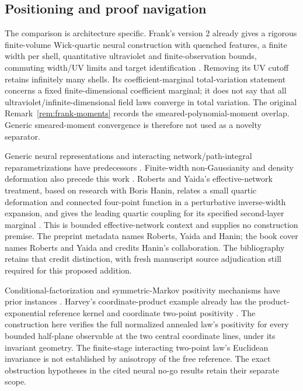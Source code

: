 \documentclass[11pt]{article}
\theoremstyle{plain}
\theoremstyle{definition}
\theoremstyle{remark}
\begin{document}
\subsection{Positioning and proof navigation}
\label{qrs:positioning}

The comparison is architecture specific. Frank's version 2 already gives
a rigorous finite-volume Wick-quartic neural construction with quenched
features, a finite width per shell, quantitative ultraviolet and
finite-observation bounds, commuting width/UV limits and target
identification \cite{Frank2026v2}. Removing its UV cutoff retains
infinitely many shells. Its coefficient-marginal total-variation statement
concerns a fixed finite-dimensional coefficient marginal; it does not say
that all ultraviolet/infinite-dimensional field laws converge in total
variation. The original Remark~\ref{rem:frank-moments} records the
smeared-polynomial-moment overlap. Generic smeared-moment convergence is
therefore not used as a novelty separator.

Generic neural representations and interacting network/path-integral
reparametrizations have predecessors
\cite{FerkoHalversonMutchler2026v1,HashimotoHironoMaedaTotsukaYoshinaka2024}.
Finite-width non-Gaussianity and density deformation also precede this
work \cite{HalversonMaitiStoner2021,Halverson2021Neurons,DemirtasHalversonMaitiSchwartzStoner2023}.
Roberts and Yaida's effective-network treatment, based on research with
Boris Hanin, relates a small quartic deformation and connected four-point
function in a perturbative inverse-width expansion, and gives the leading
quartic coupling for its specified second-layer marginal
\cite[Secs.~1.3 and 4.2]{RobertsYaida2022}. This is bounded
effective-network context and supplies no construction premise. The
preprint metadata names Roberts, Yaida and Hanin; the book cover names
Roberts and Yaida and credits Hanin's collaboration. The bibliography
retains that credit distinction, with fresh manuscript source adjudication
still required for this proposed addition.

Conditional-factorization and symmetric-Markov positivity mechanisms have
prior instances \cite{FerkoHalverson2025QMNN,FILS1978}. Harvey's
coordinate-product example already has the product-exponential reference
kernel and coordinate two-point positivity \cite{Harvey2026v2}.
The construction here verifies the full normalized annealed law's
positivity for every bounded half-plane observable at the two central
coordinate lines, under its invariant geometry. The finite-stage
interacting two-point law's Euclidean invariance is not established by
anisotropy of the free reference. The exact obstruction hypotheses in
the cited neural no-go results retain their separate scope.
\end{document}
